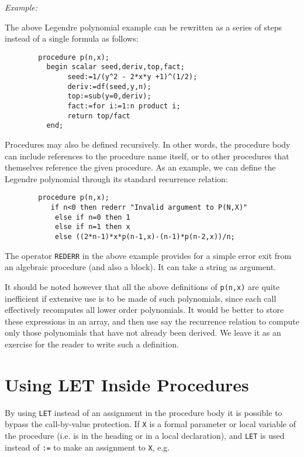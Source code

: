 {\it Example:}

The above Legendre polynomial example can be rewritten as a series of steps
instead of a single formula as follows:
\begin{verbatim}
        procedure p(n,x);
          begin scalar seed,deriv,top,fact;
               seed:=1/(y^2 - 2*x*y +1)^(1/2);
               deriv:=df(seed,y,n);
               top:=sub(y=0,deriv);
               fact:=for i:=1:n product i;
               return top/fact
          end;
\end{verbatim}
Procedures may also be defined recursively.  In other words, the procedure
body can include references to the procedure name
itself, or to other procedures that themselves reference the given
procedure.  As an example, we can define the Legendre polynomial through
its standard recurrence relation:
\begin{verbatim}
        procedure p(n,x);
           if n<0 then rederr "Invalid argument to P(N,X)"
            else if n=0 then 1
            else if n=1 then x
            else ((2*n-1)*x*p(n-1,x)-(n-1)*p(n-2,x))/n;
\end{verbatim}

The operator {\tt REDERR} in the above example provides
for a simple error exit from an algebraic procedure (and also a block).
It can take a string as argument.

It should be noted however that all the above definitions of {\tt p(n,x)} are
quite inefficient if extensive use is to be made of such polynomials, since
each call effectively recomputes all lower order polynomials. It would be
better to store these expressions in an array, and then use say the
recurrence relation to compute only those polynomials that have not already
been derived. We leave it as an exercise for the reader to write such a
definition.


\section{Using LET Inside Procedures}

By using {\tt LET} instead of an assignment in the procedure
body it is possible to bypass the call-by-value
 protection.  If {\tt X} is a formal parameter or local
variable of the procedure (i.e. is in the heading or in a local
declaration), and {\tt LET} is used instead of {\tt :=} to make an
assignment to {\tt X}, e.g.

